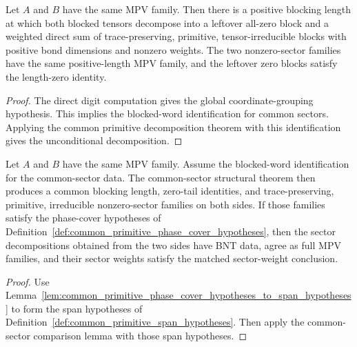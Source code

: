 \begin{theorem}%
\label{thm:unconditional_common_primitive_irreducible_blocks}
	\leanok
	Let $A$ and $B$ have the same MPV family.  Then there is a positive blocking
	length at which both blocked tensors decompose into a leftover all-zero
	block and a weighted direct sum of trace-preserving, primitive,
	tensor-irreducible blocks with positive bond dimensions and nonzero weights.
	The two nonzero-sector families have the same positive-length MPV family,
	and the leftover zero blocks satisfy the length-zero identity.
\end{theorem}

\begin{proof}
	\leanok
	The direct digit computation gives the global coordinate-grouping hypothesis.
	This implies the blocked-word identification for common sectors.  Applying the
	common primitive decomposition theorem with this identification gives the
	unconditional decomposition.
\end{proof}

\begin{lemma}%
\label{lem:afterBlocking_sectorComparison_reindexed_commonPhaseCover}
	\leanok
	Let $A$ and $B$ have the same MPV family.  Assume the blocked-word
	identification for the common-sector data.  The common-sector structural
	theorem then produces a common blocking length, zero-tail identities, and
	trace-preserving, primitive, irreducible nonzero-sector families on both sides. If those
	families satisfy the phase-cover hypotheses of
	Definition~\ref{def:common_primitive_phase_cover_hypotheses}, then the sector
	decompositions obtained from the two sides have BNT data, agree as full MPV
	families, and their sector weights satisfy the matched sector-weight conclusion.
\end{lemma}

\begin{proof}
	\leanok
	Use Lemma~\ref{lem:common_primitive_phase_cover_hypotheses_to_span_hypotheses}
		to form the span hypotheses of
	Definition~\ref{def:common_primitive_span_hypotheses}.  Then apply the
	common-sector comparison lemma with those span hypotheses.
\end{proof}

